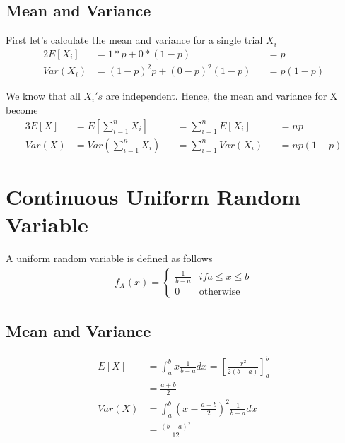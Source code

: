\documentclass[11pt, a4paper]{article}
\begin{document}
    \subsection{Mean and Variance}
    First let's calculate the mean and variance for a single trial $X_{i}$
    \begin{alignat*}{2}
        E[X_{i}] &= 1 * p + 0 * (1 - p) &&= p\\
        Var(X_{i}) &= (1 - p)^{2}p + (0-p)^{2}(1-p) &&= p(1-p)
    \end{alignat*}
    
    We know that all $X_{i}'s$ are independent. Hence, the mean and variance for X become
    \begin{alignat*}{3}
        E[X] &= E[\sum_{i=1}^{n} X_{i}] &&= \sum_{i=1}^{n}E[X_{i}] &&= np \\
        Var(X) &= Var(\sum_{i=1}^{n} X_{i}) &&= \sum_{i=1}^{n} Var(X_{i}) &&= np(1-p)
    \end{alignat*}

    \section{Continuous Uniform Random Variable}
    A uniform random variable is defined as follows
    \begin{align*}
        f_{X}(x) = \begin{cases} \frac{1}{b-a} &\mbox{$if a \leq x \leq b$}\\
                                    0 &\mbox{otherwise} \end{cases}
    \end{align*}

    \subsection{Mean and Variance}
    \begin{align*}
        E[X] &= \int_{a}^{b} x \frac{1}{b-a} dx = [\frac{x^{2}}{2(b-a)}]_{a}^{b}\\
            &= \frac{a+b}{2}\\
        Var(X) &= \int_{a}^{b} (x - \frac{a+b}{2})^{2} \frac{1}{b-a} dx \\
            &= \frac{(b-a)^{2}}{12}
    \end{align*}

\end{document}
